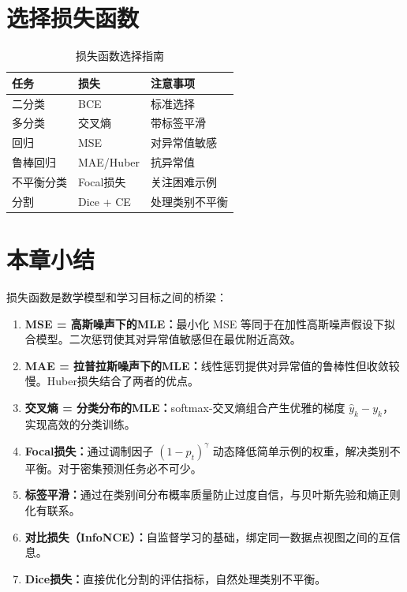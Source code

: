 \section{选择损失函数}

\begin{table}[ht]
    \centering
    \caption{损失函数选择指南}
    \begin{tabular}{L{2.5cm} L{4cm} L{4cm}}
        \toprule
        \textbf{任务} & \textbf{损失} & \textbf{注意事项} \\
        \midrule
        二分类 & BCE & 标准选择 \\
        多分类 & 交叉熵 & 带标签平滑 \\
        回归 & MSE & 对异常值敏感 \\
        鲁棒回归 & MAE/Huber & 抗异常值 \\
        不平衡分类 & Focal损失 & 关注困难示例 \\
        分割 & Dice + CE & 处理类别不平衡 \\
        \bottomrule
    \end{tabular}
\end{table}

\section{本章小结}

损失函数是数学模型和学习目标之间的桥梁：

\begin{enumerate}
    \item \textbf{MSE = 高斯噪声下的MLE：}最小化 MSE 等同于在加性高斯噪声假设下拟合模型。二次惩罚使其对异常值敏感但在最优附近高效。

    \item \textbf{MAE = 拉普拉斯噪声下的MLE：}线性惩罚提供对异常值的鲁棒性但收敛较慢。Huber损失结合了两者的优点。

    \item \textbf{交叉熵 = 分类分布的MLE：}softmax-交叉熵组合产生优雅的梯度 $\hat{y}_k - y_k$，实现高效的分类训练。

    \item \textbf{Focal损失：}通过调制因子 $(1 - p_t)^\gamma$ 动态降低简单示例的权重，解决类别不平衡。对于密集预测任务必不可少。

    \item \textbf{标签平滑：}通过在类别间分布概率质量防止过度自信，与贝叶斯先验和熵正则化有联系。

    \item \textbf{对比损失（InfoNCE）：}自监督学习的基础，绑定同一数据点视图之间的互信息。

    \item \textbf{Dice损失：}直接优化分割的评估指标，自然处理类别不平衡。
\end{enumerate}

